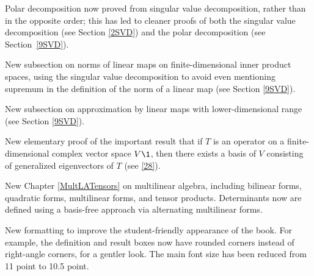 {\begin{Itemize}
\item
Polar decomposition now proved from singular value decomposition, rather than in the opposite order; this has led to cleaner proofs of both the singular value decomposition (see Section \ref{2SVD}) and the polar decomposition (see Section~\ref{9SVD}).

\item
New subsection on norms of linear maps on finite-dimensional inner product spaces, using the singular value decomposition to avoid even mentioning supremum in the definition of the norm of a linear map (see Section \ref{9SVD}).

\item
New subsection on approximation by linear maps with lower-dimensional range (see Section \ref{9SVD}).

\item
New elementary proof of the important result that if $T$ is an operator on a finite-dimensional complex vector space $V\1$, then there exists a basis of $V$ consisting of generalized eigenvectors of $T$ (see \ref{28}).


\item
New Chapter \ref{MultLATensors} on multilinear algebra, including bilinear forms, quadratic forms, multilinear forms, and tensor products. Determinants now are defined using a basis-free approach via alternating multilinear forms.

\item
New formatting to improve the student-friendly appearance of the book. For example, the definition and result boxes now have rounded corners instead of right-angle corners, for a gentler look. The main font size has been reduced from 11 point to 10.5 point.

\end{Itemize}

}
